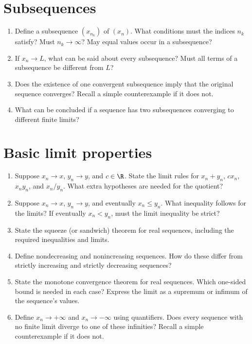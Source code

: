 \documentclass{self-check}
\begin{document}
\section{Subsequences}
\begin{enumerate}[resume]
  \item Define a subsequence \((x_{n_k})\) of \((x_n)\).
    What conditions must the indices \(n_k\) satisfy?
    Must \(n_k\to\infty\)? May equal values occur in a subsequence?

  \item If \(x_n\to L\), what can be said about every subsequence?
    Must all terms of a subsequence be different from \(L\)?

  \item Does the existence of one convergent subsequence imply that
    the original sequence converges? Recall a simple counterexample
    if it does not.

  \item What can be concluded if a sequence has two subsequences
    converging to different finite limits?
\end{enumerate}

\section{Basic limit properties}
\begin{enumerate}[resume]
  \item Suppose \(x_n\to x\), \(y_n\to y\), and \(c\in\R\).
    State the limit rules for \(x_n+y_n\), \(cx_n\), \(x_ny_n\),
    and \(x_n/y_n\). What extra hypotheses are needed for the quotient?

  \item Suppose \(x_n\to x\), \(y_n\to y\), and eventually
    \(x_n\le y_n\). What inequality follows for the limits?
    If eventually \(x_n<y_n\), must the limit inequality be strict?

  \item State the squeeze (or sandwich) theorem for real sequences,
    including the required inequalities and limits.

  \item Define nondecreasing and nonincreasing sequences.
    How do these differ from strictly increasing and strictly decreasing
    sequences?

  \item State the monotone convergence theorem for real sequences.
    Which one-sided bound is needed in each case?
    Express the limit as a supremum or infimum of the sequence's values.

  \item Define \(x_n\to+\infty\) and \(x_n\to-\infty\) using
    quantifiers. Does every sequence with no finite limit diverge to
    one of these infinities? Recall a simple counterexample if it does not.
\end{enumerate}
\end{document}

